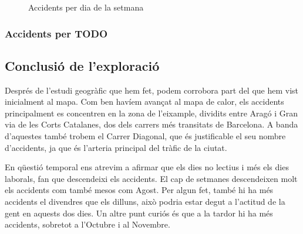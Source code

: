 \begin{figure}[H]
\footnotesize
\centering
{}%
\caption{Accidents per dia de la setmana}
\label{fig:totalsetmana}
\end{figure}

\subsubsection*{Accidents per TODO}

\subsection{Conclusió de l'exploració}
Després de l'estudi geogràfic que hem fet, podem corrobora part del que hem vist inicialment al mapa. Com ben havíem avançat al mapa de calor, els accidents principalment es concentren en la zona de l'eixample, dividits entre Aragó i Gran via de les Corts Catalanes, dos dels carrers més transitats de Barcelona. A banda d'aquestes també trobem el Carrer Diagonal, que és justificable el seu nombre d'accidents, ja que és l'arteria principal del tràfic de la ciutat.

En qüestió temporal ens atrevim a afirmar que els dies no lectius i més els dies laborals, fan que descendeixi els accidents. El cap de setmanes descendeixen molt els accidents com també mesos com Agost. Per algun fet, també hi ha més accidents el divendres que els dilluns, això podria estar degut a l'actitud de la gent en aquests dos dies. Un altre punt curiós és que a la tardor hi ha més accidents, sobretot a l'Octubre i al Novembre.



